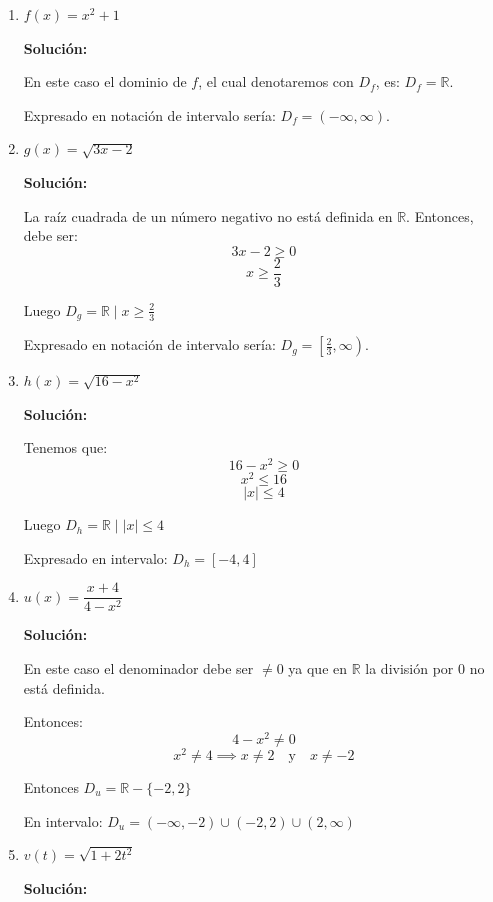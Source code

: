 \documentclass[12pt]{article}
\begin{document}
\begin{enumerate}[label=\alph*.-]
    \item $f(x) = x^2 + 1$
    
    \textbf{Solución:}
    
    En este caso el dominio de $f$, el cual denotaremos con $D_f$, es: $D_f = \mathbb{R}$.

    Expresado en notación de intervalo sería: $D_f = (-\infty, \infty)$.
    
    \item $g(x) = \sqrt{3x - 2}$
    
    \textbf{Solución:}
    
    La raíz cuadrada de un número negativo no está definida en $\mathbb{R}$. Entonces, debe ser:
    \[3x - 2 \geq 0\]
    \[x \geq \frac{2}{3}\]
    
    Luego $D_g = \mathbb{R} \mid x \geq \frac{2}{3}$
    
    Expresado en notación de intervalo sería: $D_g = \left[\frac{2}{3}, \infty\right)$.
    
    \item $h(x) = \sqrt{16 - x^2}$
    
    \textbf{Solución:}
    
    Tenemos que:
    \[16 - x^2 \geq 0\]
    \[x^2 \leq 16\]
    \[|x| \leq 4\]
    
    Luego $D_h = \mathbb{R} \mid |x| \leq 4$
    
    Expresado en intervalo: $D_h = [-4, 4]$
    
    \newpage

    \item $u(x) = \dfrac{x+4}{4-x^2}$
    
    \textbf{Solución:}
    
    En este caso el denominador debe ser $\neq 0$ ya que en $\mathbb{R}$ la división por 0 no está definida.
    
    Entonces:
    \[4 - x^2 \neq 0\]
    \[x^2 \neq 4 \implies x \neq 2 \quad \text{y} \quad x \neq -2\]
    
    Entonces $D_u = \mathbb{R} - \{-2, 2\}$
    
    En intervalo: $D_u = (-\infty, -2) \cup (-2, 2) \cup (2, \infty)$
    
    \item $v(t) = \sqrt{1 + 2t^2}$
    
    \textbf{Solución:}
    

\end{enumerate}
\end{document}
